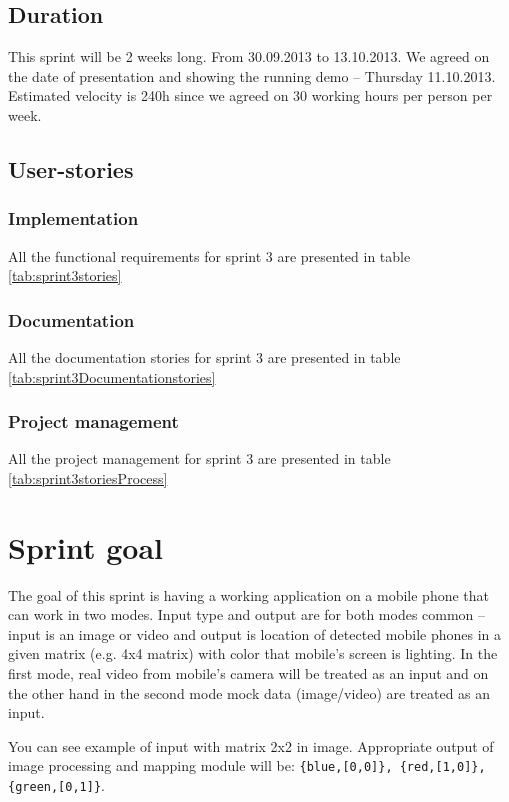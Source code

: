 \subsection{Duration}
This sprint will be 2 weeks long. From 30.09.2013 to 13.10.2013.
We agreed on the date of presentation and showing the running demo -- Thursday 11.10.2013.
Estimated velocity is 240h since we agreed on 30 working hours per person per week.

\subsection{User-stories}

\subsubsection*{Implementation}
All the functional requirements for sprint 3 are presented in table \ref{tab:sprint3stories}

\subsubsection*{Documentation}
All the documentation stories for sprint 3 are presented in table \ref{tab:sprint3Documentationstories}

\subsubsection*{Project management}
All the project management for sprint 3 are presented in table \ref{tab:sprint3storiesProcess}

\section{Sprint goal}
The goal of this sprint is having a working application on a mobile phone that can work in two modes.  
Input type and output are for both modes common -- input is an image or video and output is location of detected mobile phones in a given matrix (e.g. 4x4 matrix) with color that mobile's screen is lighting.
In the first mode, real video from mobile's camera will be treated as an input and on the other hand in the second mode mock data (image/video) are treated as an input.

You can see example of input with matrix 2x2 in image. Appropriate output of image processing and mapping module will be: \texttt{\{blue,[0,0]\}, \{red,[1,0]\}, \{green,[0,1]\}}.
